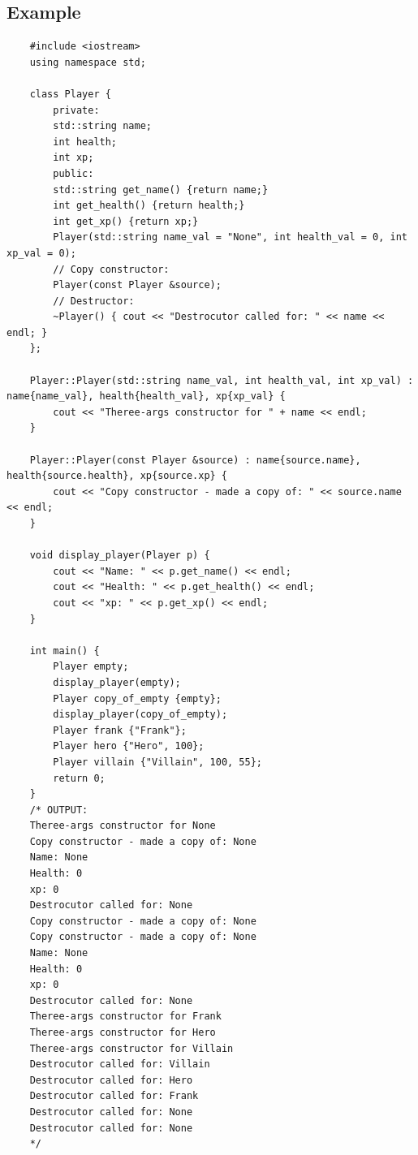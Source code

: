 \subsection{Example}
\begin{verbatim}
    #include <iostream>
    using namespace std;

    class Player {
        private:
        std::string name;
        int health;
        int xp;
        public: 
        std::string get_name() {return name;}
        int get_health() {return health;}
        int get_xp() {return xp;}
        Player(std::string name_val = "None", int health_val = 0, int xp_val = 0);
        // Copy constructor:
        Player(const Player &source);
        // Destructor:
        ~Player() { cout << "Destrocutor called for: " << name << endl; }
    };

    Player::Player(std::string name_val, int health_val, int xp_val) : name{name_val}, health{health_val}, xp{xp_val} {
        cout << "Theree-args constructor for " + name << endl;
    }

    Player::Player(const Player &source) : name{source.name}, health{source.health}, xp{source.xp} {
        cout << "Copy constructor - made a copy of: " << source.name << endl;
    }

    void display_player(Player p) {
        cout << "Name: " << p.get_name() << endl;
        cout << "Health: " << p.get_health() << endl;
        cout << "xp: " << p.get_xp() << endl;
    }

    int main() {
        Player empty;
        display_player(empty);
        Player copy_of_empty {empty};
        display_player(copy_of_empty);
        Player frank {"Frank"};
        Player hero {"Hero", 100};
        Player villain {"Villain", 100, 55};
        return 0;
    }
    /* OUTPUT:
    Theree-args constructor for None
    Copy constructor - made a copy of: None
    Name: None
    Health: 0
    xp: 0
    Destrocutor called for: None
    Copy constructor - made a copy of: None
    Copy constructor - made a copy of: None
    Name: None
    Health: 0
    xp: 0
    Destrocutor called for: None
    Theree-args constructor for Frank
    Theree-args constructor for Hero
    Theree-args constructor for Villain
    Destrocutor called for: Villain
    Destrocutor called for: Hero
    Destrocutor called for: Frank
    Destrocutor called for: None
    Destrocutor called for: None
    */
\end{verbatim}

